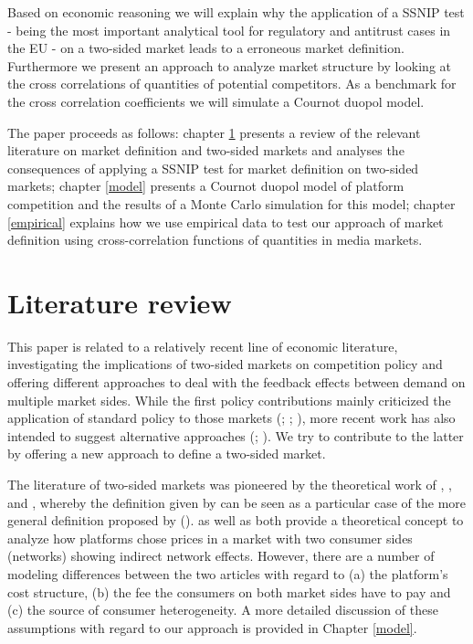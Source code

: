 \documentclass[12pt,a4paper]{scrreprt}
\begin{document}
Based on economic reasoning we will explain why the application of a SSNIP test - being the most important analytical tool for regulatory and antitrust cases in the EU - on a two-sided market leads to a erroneous market definition. Furthermore we present an approach to analyze market structure by looking at the cross correlations of quantities of potential competitors. As a benchmark for the cross correlation coefficients we will simulate a Cournot duopol model. 

The paper proceeds as follows: chapter \ref{litrev} presents a review of the relevant literature on market definition and two-sided markets and analyses the consequences of applying a SSNIP test for market definition on two-sided markets; chapter \ref{model} presents a Cournot duopol model of platform competition and the results of a Monte Carlo simulation for this model; chapter \ref{empirical}  explains how we use empirical data to test our approach of market definition using cross-correlation functions of quantities in media markets.  





\chapter{Literature review}\label{litrev}
This paper is related to a relatively recent line of economic literature, investigating the implications of two-sided markets on competition policy and offering different approaches to deal with the feedback effects between demand on multiple market sides. While the first policy contributions mainly criticized the application of standard policy to those markets (\cite{wright_one-sided_2004}; \cite{leonello_horizontal_2010}; \cite{chandra_mergers_2009}), more recent work has also intended to suggest alternative approaches (\cite{argentesi_estimating_2007}; \cite{song_estimating_2015}). We try to contribute to the latter by offering a new approach to define a two-sided market. 

The literature of two-sided markets was pioneered by the theoretical work of \cite{caillaud_chicken_2003}, \cite{rochet_platform_2003}, \cite{evans_antitrust_2003} and \cite{armstrong_competition_2006}, whereby the definition given by \cite{evans_antitrust_2003} can be seen as a particular case of the more general definition proposed by \cite{rochet_platform_2003} (\cite{filistrucchi_identifying_2012}). \cite{rochet_platform_2003} as well as \cite{armstrong_competition_2006} both provide a theoretical concept to analyze how platforms chose prices in a market with two consumer sides (networks) showing indirect network effects. However, there are a number of modeling differences between the two articles with regard to (a) the platform's cost structure, (b) the fee the consumers on both market sides have to pay and (c) the source of consumer heterogeneity. A more detailed discussion of these assumptions with regard to our approach is provided in Chapter \ref{model}.  
\end{document}
